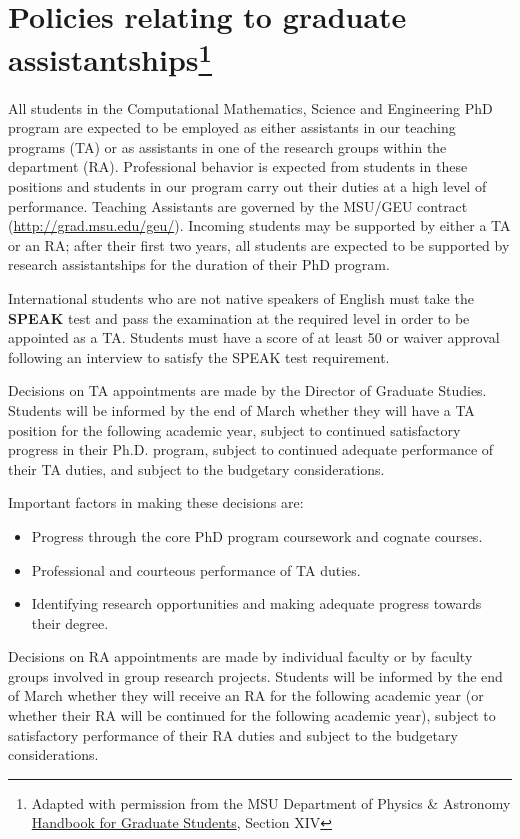 \section[Policies relating to graduate assistantships]{Policies
relating to graduate assistantships\footnote{Adapted with permission
from the MSU Department of Physics \& Astronomy
\href{https://www.pa.msu.edu/grad/GradHandbook_Aug2015.pdf}{Handbook
for Graduate Students}, Section XIV}}

All students in the Computational
Mathematics, Science and Engineering PhD program are expected to be
employed as either assistants in our teaching programs (TA) or as
assistants in one of the research groups within the department (RA).
Professional behavior is expected from students in these positions and
students in our program carry out their duties at a high level of
performance.  Teaching Assistants are governed by the MSU/GEU contract
(\url{http://grad.msu.edu/geu/}).  Incoming students may be supported
by either a TA or an RA; after their first two years, all students are
expected to be supported by research assistantships for the duration
of their PhD program.

International students who are not native speakers of English must
take the \textbf{SPEAK} test and pass the examination at the required
level in order to be appointed as a TA.  Students must have a score of
at least 50 or waiver approval following an interview to satisfy the
SPEAK test requirement.

Decisions on TA appointments are made by the Director of Graduate
Studies.  Students will be informed by the end of March whether they
will have a TA position for the following academic year, subject to
continued satisfactory progress in their Ph.D. program, subject to
continued adequate performance of their TA duties, and subject to the
budgetary considerations.

Important factors in making these decisions are:

\begin{itemize}
\item Progress through the core PhD program coursework and 
cognate courses.
\item Professional and courteous performance of TA duties.
\item Identifying research opportunities and making adequate progress
towards their degree.
\end{itemize}

Decisions on RA appointments are made by individual faculty or by
faculty groups involved in group research projects. Students will be
informed by the end of March whether they will receive an RA for the
following academic year (or whether their RA will be continued for
the following academic year), subject to satisfactory performance of
their RA duties and subject to the budgetary considerations.

